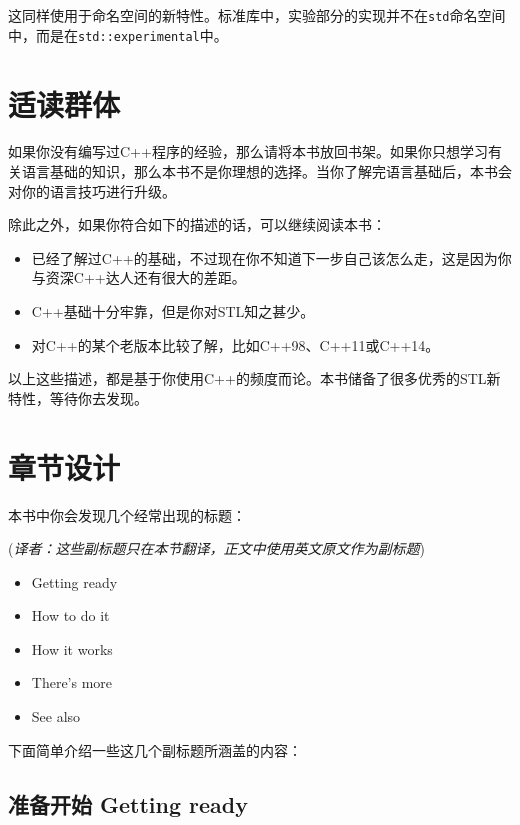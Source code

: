 这同样使用于命名空间的新特性。标准库中，实验部分的实现并不在\texttt{std}命名空间中，而是在\texttt{std::experimental}中。

\section{适读群体}

如果你没有编写过C++程序的经验，那么请将本书放回书架。如果你只想学习有关语言基础的知识，那么本书不是你理想的选择。当你了解完语言基础后，本书会对你的语言技巧进行升级。

除此之外，如果你符合如下的描述的话，可以继续阅读本书：

\begin{itemize}
\item 已经了解过C++的基础，不过现在你不知道下一步自己该怎么走，这是因为你与资深C++达人还有很大的差距。

\item C++基础十分牢靠，但是你对STL知之甚少。

\item 对C++的某个老版本比较了解，比如C++98、C++11或C++14。

\end{itemize}

以上这些描述，都是基于你使用C++的频度而论。本书储备了很多优秀的STL新特性，等待你去发现。

\section{章节设计}

本书中你会发现几个经常出现的标题：

(\emph{译者：这些副标题只在本节翻译，正文中使用英文原文作为副标题})

\begin{itemize}
\item Getting ready

\item How to do it

\item How it works

\item There's more

\item See also

\end{itemize}

下面简单介绍一些这几个副标题所涵盖的内容：

\subsection{准备开始 Getting ready}

